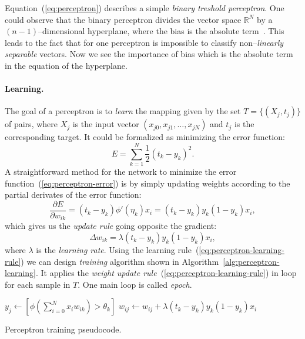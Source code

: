 Equation~(\ref{eq:perceptron}) describes a simple \emph{binary treshold perceptron}. One could observe that the binary perceptron divides the vector space $\mathbb{R}^N$ by a $(n-1)$--dimensional hyperplane, where the bias is the absolute term~\citep{rosenblatt1958perceptron}.  \label{sec:linear-sep} This leads to the fact that for one perceptron is impossible to classify non--\emph{linearly separable} vectors. Now we see the importance of bias which is the absolute term in the equation of the hyperplane.

\paragraph{Learning.} 
The goal of a perceptron is to \emph{learn} the mapping given by the set $T = \{(X_j, t_j)\}$ of pairs, where $X_j$ is the input vector $(x_{j0},x_{j1}, \ldots, x_{jN})$ and $t_j$ is the corresponding target. It could be formalized as minimizing the error function: 
\begin{equation}
\label{eq:perceptron-error} 
E = \sum_{k=1}^{N} \frac{1}{2}(t_k-y_k)^2.
\end{equation} 
A straightforward method for the network to minimize the error function~(\ref{eq:perceptron-error}) is by simply updating weights according to the partial derivates of the error function: 
\begin{equation}
\label{eq:perceptron-learning} 
\frac{\partial E}{\partial w_{ik}} = (t_k - y_k)\phi'(\eta_k)x_i = (t_k - y_k)y_k(1 - y_k)x_i,
\end{equation} 
which gives us the \emph{update rule} going opposite the gradient: 
\begin{equation} 
\label{eq:perceptron-learning-rule} 
\Delta w_{ik} = \lambda (t_k - y_k)y_k(1 - y_k)x_i,
\end{equation} 
where $\lambda$ is the \emph{learning rate}. Using the learning rule~(\ref{eq:perceptron-learning-rule}) we can design \emph{training} algorithm shown in Algorithm~\ref{alg:perceptron-learning}. It applies the \emph{weight update rule}~(\ref{eq:perceptron-learning-rule}) in loop for each sample in $T$. One main loop is called \emph{epoch}.

\begin{algorithm}[h]
  \begin{algorithmic}
        \State $y_j \gets [\phi(\sum_{i=0}^N x_iw_{ik}) > \theta_k]$
          \State $w_{ij} \gets w_{ij} + \lambda (t_k - y_k)y_k(1 - y_k)x_i$
        \EndFor
      \EndFor
    \EndFor
  \end{algorithmic}
  \caption{Perceptron training pseudocode.}  
  \label{alg:perceptron-learning}
\end{algorithm} 

